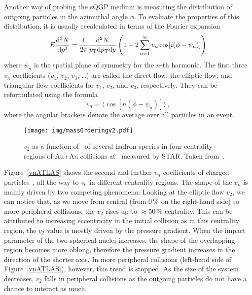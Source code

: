 Another way of probing the sQGP medium is measuring the distribution of outgoing particles in the azimuthal angle $\phi$\@. To evaluate the properties of this distribution, it is usually recalculated in terms of the Fourier expansion
\begin{equation}
E\frac{\mathrm{d}^3 N}{ \mathrm{d} p^3} = \frac{1}{2\pi}\frac{\mathrm{d}^2 N}{{p_{\mathrm{T}}} \mathrm{d} {p_{\mathrm{T}}} \mathrm{d} y} \left(1 + 2\sum_{n=1}^\infty v_n \cos[i(\phi - \psi_n)] \right)
\end{equation}
where $\psi_n$ is the spatial plane of symmetry for the $n$-th harmonic. The first three $v_n$ coefficients ($v_1$, $v_2$, $v_3$, \dots) are called the direct flow, the elliptic flow, and triangular flow coefficients for $v_1$, $v_2$, and $v_3$, respectively. They can be reformulated using the formula
\begin{equation}
v_n = \langle \cos[n(\phi - \psi_n)] \rangle\,,
\end{equation}
where the angular brackets denote the average over all particles in an event.



\begin{figure}[!htb]
\centering
\texttt{[image: img/massOrderingv2.pdf]}
\caption[$v_2$ as a function of \pt\ of several hadron species in four centrality regions of Au+Au collisions.]{\label{massOrdering}$v_2$ as a function of \pt\ of several hadron species in four centrality regions of Au+Au collisions at \snnFull\ measured by STAR\@. Taken from~\cite{StrangeAndChargedv2paper}.}

\end{figure}
Figure~\ref{vnATLAS} shows the second and further $v_n$ coefficients of charged particles~\cite{vnATLAS}, all the way to $v_6$ in different centrality regions\@. The shape of the $v_n$ is mainly driven by two competing phenomena: Looking at the elliptic flow $v_2$, we can notice that, as we move from central (from 0$\,\%$ on the right-hand side) to more peripheral collisions, the $v_2$ rises up to $\approx50\,\%$ centrality. This can be attributed to increasing eccentricity in the initial collision as in this centrality region, the $v_2$ value is mostly driven by the pressure gradient. When the impact parameter of the two spherical nuclei increases, the shape of the overlapping region becomes more oblong, therefore the pressure gradient increases in the direction of the shorter axis. In more peripheral collisions (left-hand side of Figure~\ref{vnATLAS}), however, this trend is stopped. As the size of the system decreases, $v_2$ falls in peripheral collisions as the outgoing particles do not have a chance to interact as much.

